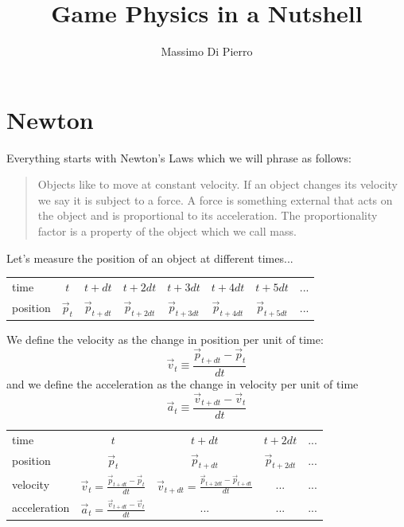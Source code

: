 \documentclass[12pt]{article}
\title{Game Physics in a Nutshell}
\author{Massimo Di Pierro}
\date{}
\begin{document}
\maketitle
\tableofcontents
\newpage

\section{Newton}

Everything starts with Newton's Laws which we will phrase as follows:

\begin{quote}
Objects like to move at constant velocity. If an object changes its velocity we say it is subject to a force. A force is something external that acts on the object and is proportional to its acceleration. The proportionality factor is a property of the object which we call mass.
\end{quote}

Let's measure the position of an object at different times...

\begin{center}
\begin{tabular}{lccccccc} \hline
time & $t$ & $t+dt$ & $t+2dt$ & $t+3dt$ & $t+4dt$ & $t+5dt$ & ... \\
position & $\vec p_t$ & $\vec p_{t+dt}$ & $\vec p_{t+2dt}$ & $\vec p_{t+3dt}$ & $\vec p_{t+4dt}$ & $\vec p_{t+5dt}$ & ... \\ \hline
\end{tabular}
\end{center}

We define the velocity as the change in position per unit of time:
\begin{equation}
\vec v_t \equiv \frac{\vec p_{t+dt}-\vec p_t}{dt}
\label{one}
\end{equation}
and we define the acceleration as the change in velocity per unit of time
\begin{equation}
\vec a_t \equiv \frac{\vec v_{t+dt}-\vec v_t}{dt}
\label{two}
\end{equation}

\begin{center}
\begin{tabular}{lcccc} \hline
time & $t$ & $t+dt$ & $t+2dt$ & ... \\
position & $\vec p_t$ & $\vec p_{t+dt}$ & $\vec p_{t+2dt}$ & ... \\
velocity & $\vec v_t = \frac{\vec p_{t+dt}-\vec p_t}{dt}$ & $\vec v_{t+dt} = \frac{\vec p_{t+2dt}-\vec p_{t+dt}}{dt}$ & ... & ... \\
acceleration & $\vec a_t = \frac{\vec v_{t+dt}-\vec v_t}{dt}$ & ... & ... & ... \\ \hline
\end{tabular}
\end{center}
\end{document}
